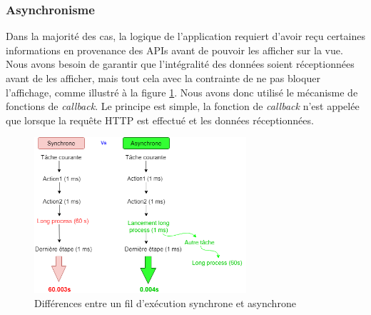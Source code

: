\subsubsection{Asynchronisme}
Dans la majorité des cas, la logique de l'application requiert d'avoir reçu certaines informations en provenance des APIs avant de pouvoir les afficher sur la vue. Nous avons besoin de garantir que l'intégralité des données soient réceptionnées avant de les afficher, mais tout cela avec la contrainte de ne pas bloquer l'affichage, comme illustré à la figure \ref{asynchrone}.
Nous avons donc utilisé le mécanisme de fonctions de \textit{callback}. Le principe est simple, la fonction de \textit{callback} n'est appelée que lorsque la requête HTTP est effectué et les données réceptionnées.
\begin{figure}
    \begin{center}
        \includegraphics[width=0.7\textwidth]{img/schemas/Asynchronisme2.png}
    \end{center}
    \caption{Différences entre un fil d'exécution synchrone et asynchrone}
    \label{asynchrone}
\end{figure}

